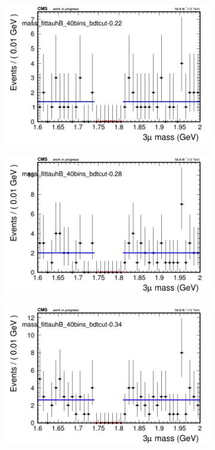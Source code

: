 \begin{figure}[H]
\begin{subfigure}{0.2\textwidth}
        \includegraphics[width=\textwidth]{flat_fit/plots/tauhB/massfit_tauhB_40bins_bdtcut-0.22.png}
        \caption{}
    \end{subfigure}
    \begin{subfigure}{0.2\textwidth}
        \includegraphics[width=\textwidth]{flat_fit/plots/tauhB/massfit_tauhB_40bins_bdtcut-0.28.png}
        \caption{}
    \end{subfigure}
    \begin{subfigure}{0.2\textwidth}
        \includegraphics[width=\textwidth]{flat_fit/plots/tauhB/massfit_tauhB_40bins_bdtcut-0.34.png}

\end{subfigure}
\end{figure}
